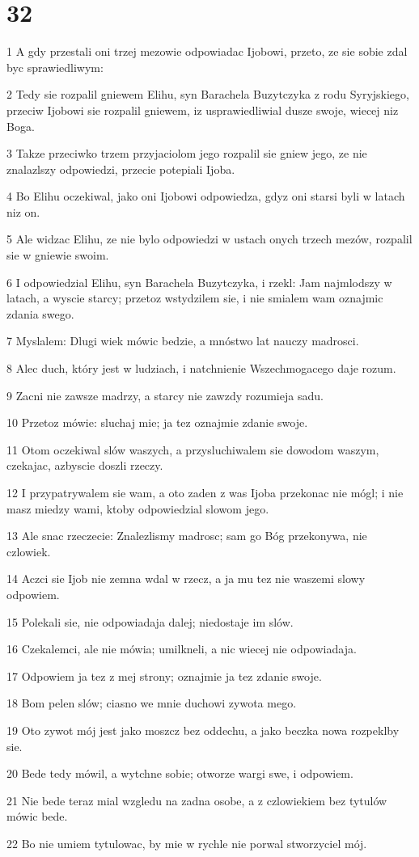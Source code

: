 \chapter{32}

\par 1 A gdy przestali oni trzej mezowie odpowiadac Ijobowi, przeto, ze sie sobie zdal byc sprawiedliwym:
\par 2 Tedy sie rozpalil gniewem Elihu, syn Barachela Buzytczyka z rodu Syryjskiego, przeciw Ijobowi sie rozpalil gniewem, iz usprawiedliwial dusze swoje, wiecej niz Boga.
\par 3 Takze przeciwko trzem przyjaciolom jego rozpalil sie gniew jego, ze nie znalazlszy odpowiedzi, przecie potepiali Ijoba.
\par 4 Bo Elihu oczekiwal, jako oni Ijobowi odpowiedza, gdyz oni starsi byli w latach niz on.
\par 5 Ale widzac Elihu, ze nie bylo odpowiedzi w ustach onych trzech mezów, rozpalil sie w gniewie swoim.
\par 6 I odpowiedzial Elihu, syn Barachela Buzytczyka, i rzekl: Jam najmlodszy w latach, a wyscie starcy; przetoz wstydzilem sie, i nie smialem wam oznajmic zdania swego.
\par 7 Myslalem: Dlugi wiek mówic bedzie, a mnóstwo lat nauczy madrosci.
\par 8 Alec duch, który jest w ludziach, i natchnienie Wszechmogacego daje rozum.
\par 9 Zacni nie zawsze madrzy, a starcy nie zawzdy rozumieja sadu.
\par 10 Przetoz mówie: sluchaj mie; ja tez oznajmie zdanie swoje.
\par 11 Otom oczekiwal slów waszych, a przysluchiwalem sie dowodom waszym, czekajac, azbyscie doszli rzeczy.
\par 12 I przypatrywalem sie wam, a oto zaden z was Ijoba przekonac nie mógl; i nie masz miedzy wami, ktoby odpowiedzial slowom jego.
\par 13 Ale snac rzeczecie: Znalezlismy madrosc; sam go Bóg przekonywa, nie czlowiek.
\par 14 Aczci sie Ijob nie zemna wdal w rzecz, a ja mu tez nie waszemi slowy odpowiem.
\par 15 Polekali sie, nie odpowiadaja dalej; niedostaje im slów.
\par 16 Czekalemci, ale nie mówia; umilkneli, a nic wiecej nie odpowiadaja.
\par 17 Odpowiem ja tez z mej strony; oznajmie ja tez zdanie swoje.
\par 18 Bom pelen slów; ciasno we mnie duchowi zywota mego.
\par 19 Oto zywot mój jest jako moszcz bez oddechu, a jako beczka nowa rozpeklby sie.
\par 20 Bede tedy mówil, a wytchne sobie; otworze wargi swe, i odpowiem.
\par 21 Nie bede teraz mial wzgledu na zadna osobe, a z czlowiekiem bez tytulów mówic bede.
\par 22 Bo nie umiem tytulowac, by mie w rychle nie porwal stworzyciel mój.

